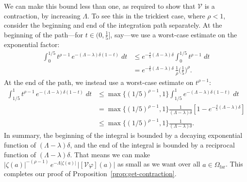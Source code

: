 \documentclass[final]{siamart220329}
\newcommand{\volterra}{\mathcal{V}}
\newcommand{\far}{\Omega_\text{far}}
\begin{document}
We can make this bound less than one, as required to show that $\volterra$ is a contraction, by increasing $\Lambda$. To see this in the trickiest case, where $\rho < 1$, consider the beginning and end of the integration path separately. At the beginning of the path---for $t \in \big(0, \tfrac{1}{5}\big]$, say---we use a worst-case estimate on the exponential factor:
\begin{align*}
\int_0^{1/5} t^{\rho-1}\,e^{-(\Lambda - \lambda)\delta(1 - t)}\;dt & \le e^{-\frac{4}{5}(\Lambda -\lambda)\delta} \int_0^{1/5} t^{\rho-1}\;dt \\
& = e^{-\frac{4}{5}(\Lambda - \lambda)\delta}\,\tfrac{1}{\rho} \big(\tfrac{1}{5}\big)^\rho.
\end{align*}
At the end of the path, we instead use a worst-case estimate on $t^{\rho-1}$:
\begin{align*}
\int_{1/5}^1 t^{\rho-1}\,e^{-(\Lambda - \lambda)\delta(1 - t)}\;dt & \le \max\{(1/5)^{\rho-1}, 1\} \int_{1/5}^1 e^{-(\Lambda - \lambda)\delta(1 - t)}\;dt \\
& = \max\{(1/5)^{\rho-1}, 1\} \frac{1}{(\Lambda - \lambda)\delta}\left[ 1 - e^{-\tfrac{4}{5}(\Lambda - \lambda)\delta} \right] \\
& \le \max\{(1/5)^{\rho-1}, 1\} \frac{1}{(\Lambda - \lambda)\delta}.
\end{align*}
In summary, the beginning of the integral is bounded by a decaying exponential function of $(\Lambda - \lambda)\delta$, and the end of the integral is bounded by a reciprocal function of $(\Lambda - \lambda)\delta$. That means we can make $|\zeta(a)|^{-(\rho-1)}\,e^{-\Lambda|\zeta(a)|}\,\big|[\volterra\varphi](a)\big|$ as small as we want over all $a \in \far$. This completes our proof of Proposition~\ref{prop:get-contraction}.
\end{document}
